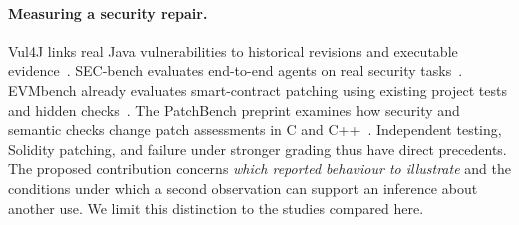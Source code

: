 \paragraph{Measuring a security repair.}
Vul4J links real Java vulnerabilities to historical revisions and executable evidence~\cite{bui2022vul4j}. SEC-bench evaluates end-to-end agents on real security tasks~\cite{lee2025secbench}. EVMbench already evaluates smart-contract patching using existing project tests and hidden checks~\cite{wang2026evmbench}. The PatchBench preprint examines how security and semantic checks change patch assessments in C and C++~\cite{shen2026patchbench}. Independent testing, Solidity patching, and failure under stronger grading thus have direct precedents. The proposed contribution concerns \emph{which reported behaviour to illustrate} and the conditions under which a second observation can support an inference about another use. We limit this distinction to the studies compared here.
